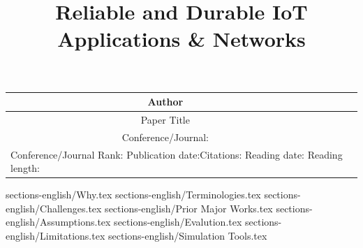 \documentclass[a4paper,11pt]{article}
\title{ \vspace{-2cm} Reliable and Durable IoT Applications \& Networks \vspace{-5ex}}
\author{}
\date{}
\begin{document}
    \maketitle
    \thispagestyle{fancy}
    \begin{table}[h!]
        \centering
        \begin{tabularx}{\linewidth}{|c|X|}
            \hline
            Author \cellcolor{babyblueeyes} & \\ \hline
            Paper Title \cellcolor{babyblueeyes} & \\ \hline
            Conference/Journal: \cellcolor{babyblueeyes} & \\ \hline
            \multicolumn{2}{|l|}{Conference/Journal Rank: \quad Publication date:\quad Citations: \quad Reading date: \quad Reading length:}\\ \hline

        \end{tabularx}
    \end{table}

    {sections-english/Why.tex}
    {sections-english/Terminologies.tex}
    {sections-english/Challenges.tex}
    {sections-english/Prior Major Works.tex}
    {sections-english/Assumptions.tex}
    {sections-english/Evalution.tex}
    {sections-english/Limitations.tex}
    {sections-english/Simulation Tools.tex}
    
    
\end{document}
